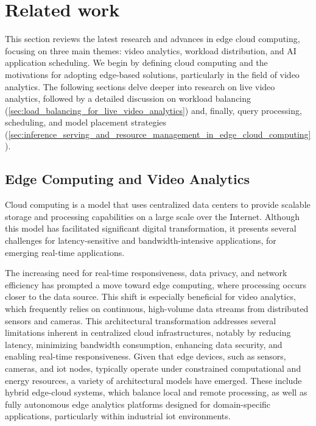 \setchapterpreamble[u]{\margintoc}
\chapter{Related work}\label{ch:related_work}

This section reviews the latest research and advances in edge cloud computing, focusing on three main themes: video analytics, workload distribution, and AI application scheduling. We begin by defining cloud computing and the motivations for adopting edge-based solutions, particularly in the field of video analytics. The following sections delve deeper into research on live video analytics, followed by a detailed discussion on workload balancing (\cref{sec:load_balancing_for_live_video_analytics}) and, finally, query processing, scheduling, and model placement strategies (\cref{sec:inference_serving_and_resource_management_in_edge_cloud_computing}).


\section{Edge Computing and Video Analytics}

Cloud computing is a model that uses centralized data centers to provide scalable storage and processing capabilities on a large scale over the Internet. Although this model has facilitated significant digital transformation, it presents several challenges for latency-sensitive and bandwidth-intensive applications, for emerging real-time applications.

The increasing need for real-time responsiveness, data privacy, and network efficiency has prompted a move toward edge computing, where processing occurs closer to the data source. This shift is especially beneficial for video analytics, which frequently relies on continuous, high-volume data streams from distributed sensors and cameras. This architectural transformation addresses several limitations inherent in centralized cloud infrastructures, notably by reducing latency, minimizing bandwidth consumption, enhancing data security, and enabling real-time responsiveness. Given that edge devices, such as sensors, cameras, and \acrfull{iot} nodes, typically operate under constrained computational and energy resources, a variety of architectural models have emerged. These include hybrid edge-cloud systems, which balance local and remote processing, as well as fully autonomous edge analytics platforms designed for domain-specific applications, particularly within industrial \acrshort{iot} environments.

